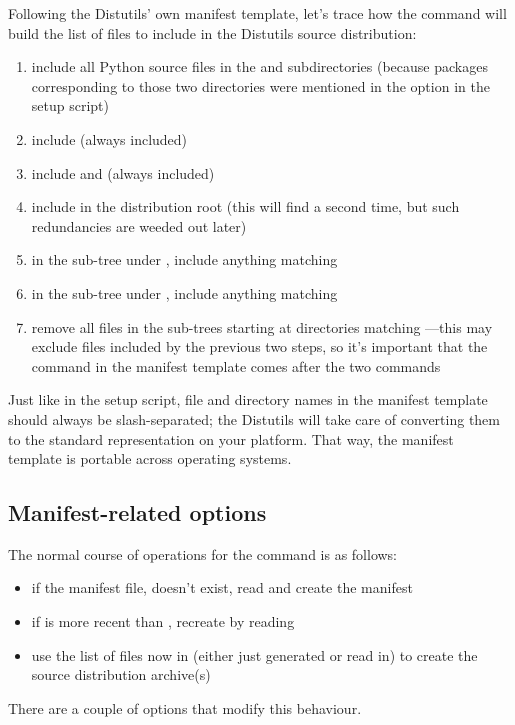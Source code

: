 \documentclass{howto}
\begin{document}
Following the Distutils' own manifest template, let's trace how the
 command will build the list of files to include in the
Distutils source distribution:
\begin{enumerate}
\item include all Python source files in the  and
   subdirectories (because packages
  corresponding to those two directories were mentioned in the
   option in the setup script)
\item include  (always included)
\item include  and  (always included)
\item include  in the distribution root (this will find
   a second time, but such redundancies are weeded out
  later)
\item in the sub-tree under , include anything matching
\item in the sub-tree under , include anything matching
\item remove all files in the sub-trees starting at directories matching
  ---this may exclude files included by the
  previous two steps, so it's important that the  command in
  the manifest template comes after the two 
  commands
\end{enumerate}

Just like in the setup script, file and directory names in the manifest
template should always be slash-separated; the Distutils will take care
of converting them to the standard representation on your platform.
That way, the manifest template is portable across operating systems.


\subsection{Manifest-related options}
\label{manifest-options}

The normal course of operations for the  command is as
follows:
\begin{itemize}
\item if the manifest file,  doesn't exist, read
   and create the manifest
\item if  is more recent than ,
  recreate  by reading 
\item use the list of files now in  (either just
  generated or read in) to create the source distribution archive(s)
\end{itemize}
There are a couple of options that modify this behaviour.
\end{document}
